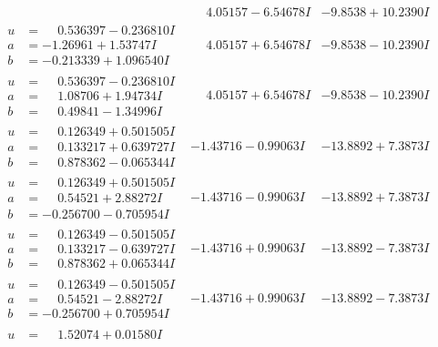 \documentclass[1p]{elsarticle_modified}
\theoremstyle{definition}
\begin{document}
$$\begin{array}{c|c|c}
 & \phantom{-}4.05157 - 6.54678 I & -9.8538 + 10.2390 I \\ \hline\begin{aligned}
u &= \phantom{-}0.536397 - 0.236810 I \\
a &= -1.26961 + 1.53747 I \\
b &= -0.213339 + 1.096540 I\end{aligned}
 & \phantom{-}4.05157 + 6.54678 I & -9.8538 - 10.2390 I \\ \hline\begin{aligned}
u &= \phantom{-}0.536397 - 0.236810 I \\
a &= \phantom{-}1.08706 + 1.94734 I \\
b &= \phantom{-}0.49841 - 1.34996 I\end{aligned}
 & \phantom{-}4.05157 + 6.54678 I & -9.8538 - 10.2390 I \\ \hline\begin{aligned}
u &= \phantom{-}0.126349 + 0.501505 I \\
a &= \phantom{-}0.133217 + 0.639727 I \\
b &= \phantom{-}0.878362 - 0.065344 I\end{aligned}
 & -1.43716 - 0.99063 I & -13.8892 + 7.3873 I \\ \hline\begin{aligned}
u &= \phantom{-}0.126349 + 0.501505 I \\
a &= \phantom{-}0.54521 + 2.88272 I \\
b &= -0.256700 - 0.705954 I\end{aligned}
 & -1.43716 - 0.99063 I & -13.8892 + 7.3873 I \\ \hline\begin{aligned}
u &= \phantom{-}0.126349 - 0.501505 I \\
a &= \phantom{-}0.133217 - 0.639727 I \\
b &= \phantom{-}0.878362 + 0.065344 I\end{aligned}
 & -1.43716 + 0.99063 I & -13.8892 - 7.3873 I \\ \hline\begin{aligned}
u &= \phantom{-}0.126349 - 0.501505 I \\
a &= \phantom{-}0.54521 - 2.88272 I \\
b &= -0.256700 + 0.705954 I\end{aligned}
 & -1.43716 + 0.99063 I & -13.8892 - 7.3873 I \\ \hline\begin{aligned}
u &= \phantom{-}1.52074 + 0.01580 I \\

\end{aligned}
\end{array}$$
\end{document}

